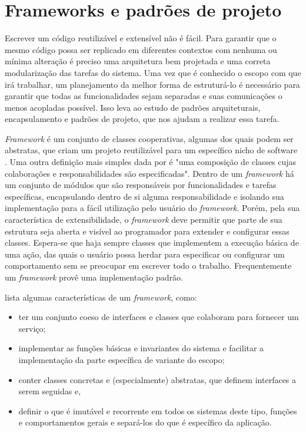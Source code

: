 \section{Frameworks e padrões de projeto}

Escrever um código reutilizável e extensível não é fácil. Para garantir que o mesmo código possa ser replicado em diferentes contextos com nenhuma ou mínima alteração é preciso uma arquitetura bem projetada e uma correta modularização das tarefas do sistema. Uma vez que é conhecido o escopo com que irá trabalhar, um planejamento da melhor forma de estruturá-lo é necessário para garantir que todas as funcionalidades sejam separadas e suas comunicações o menos acopladas possível. Isso leva ao estudo de padrões arquiteturais, encapsulamento e padrões de projeto, que nos ajudam a realizar essa tarefa.

\textit{Framework} é um conjunto de classes cooperativas, algumas dos quais podem ser abstratas, que criam um projeto reutilizável para um específico nicho de software \cite{Szyperski2002}. Uma outra definição mais simples dada por \cite{Fayad1999} é "uma composição de classes cujas colaborações e responsabilidades são especificadas". Dentro de um \textit{framework} há um conjunto de módulos que são responsáveis por funcionalidades e tarefas específicas, encapsulando dentro de si alguma responsabilidade e isolando sua implementação para a fácil utilização pelo usuário do \textit{framework}. Porém, pela sua característica de extensibilidade, o \textit{framework} deve permitir que parte de sua estrutura seja aberta e visível ao programador para extender e configurar essas classes. Espera-se que haja sempre classes que implementem a execução básica de uma ação, das quais o usuário possa herdar para especificar ou configurar um comportamento sem se preocupar em escrever todo o trabalho. Frequentemente um \textit{framework} provê uma implementação padrão.

\cite{Larman2005} lista algumas características de um \textit{framework}, como:
\begin{itemize}
  \item ter um conjunto coeso de interfaces e classes que colaboram para fornecer um serviço;
  \item implementar as funções básicas e invariantes do sistema e facilitar a implementação da parte específica de variante do escopo;
  \item conter classes concretas e (especialmente) abstratas, que definem interfaces a serem seguidas e,
  \item definir o que é imutável e recorrente em todos os sistemas deste tipo, funções e comportamentos gerais e separá-los do que é específico da aplicação.
\end{itemize} 


